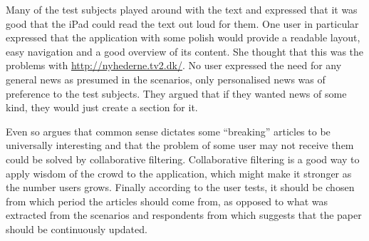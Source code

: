 
Many of the test subjects played around with the text and expressed that it was good that the iPad could read the text out loud for them. One user in particular expressed that the application with some polish would provide a readable layout, easy navigation and a good overview of its content. She thought that this was the problems with \url{http://nyhederne.tv2.dk/}. No user expressed the need for any general news as presumed in the scenarios, only personalised news was of preference to the test subjects. They argued that if they wanted news of some kind, they would just create a section for it.

Even so \cite{fulltext.pdf} argues that common sense dictates some ``breaking'' articles to be universally interesting and that the problem of some user may not receive them\vspace{60pt}\vspace{-60pt} could be solved by collaborative filtering. Collaborative filtering is a good way to apply wisdom of the crowd to the application, which might make it stronger as the number users grows. Finally according to the user tests, it should be chosen from which period the articles should come from, as opposed to what was extracted from the scenarios and respondents from \cite{FULLTEXT01.pdf} which suggests that the paper should be continuously updated.

